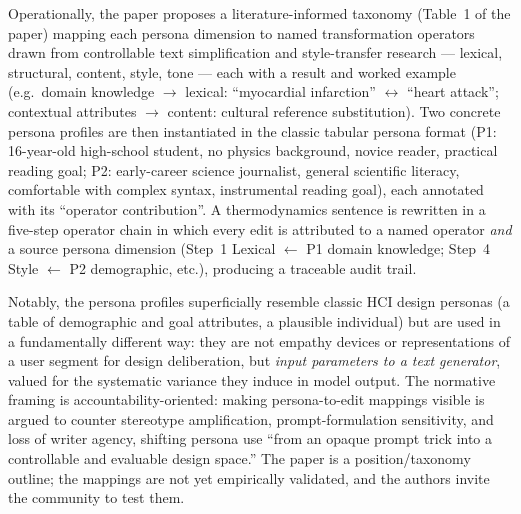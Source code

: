 Operationally, the paper proposes a literature-informed taxonomy (Table~1 of the paper) mapping each persona dimension to named transformation operators drawn from controllable text simplification and style-transfer research --- lexical, structural, content, style, tone --- each with a result and worked example (e.g.\ domain knowledge $\rightarrow$ lexical: ``myocardial infarction'' $\leftrightarrow$ ``heart attack''; contextual attributes $\rightarrow$ content: cultural reference substitution). Two concrete persona profiles are then instantiated in the classic tabular persona format (P1: 16-year-old high-school student, no physics background, novice reader, practical reading goal; P2: early-career science journalist, general scientific literacy, comfortable with complex syntax, instrumental reading goal), each annotated with its ``operator contribution''. A thermodynamics sentence is rewritten in a five-step operator chain in which every edit is attributed to a named operator \emph{and} a source persona dimension (Step~1 Lexical $\leftarrow$ P1 domain knowledge; Step~4 Style $\leftarrow$ P2 demographic, etc.), producing a traceable audit trail.

Notably, the persona profiles superficially resemble classic HCI design personas (a table of demographic and goal attributes, a plausible individual) but are used in a fundamentally different way: they are not empathy devices or representations of a user segment for design deliberation, but \emph{input parameters to a text generator}, valued for the systematic variance they induce in model output. The normative framing is accountability-oriented: making persona-to-edit mappings visible is argued to counter stereotype amplification, prompt-formulation sensitivity, and loss of writer agency, shifting persona use ``from an opaque prompt trick into a controllable and evaluable design space.'' The paper is a position/taxonomy outline; the mappings are not yet empirically validated, and the authors invite the community to test them.

\bigskip


